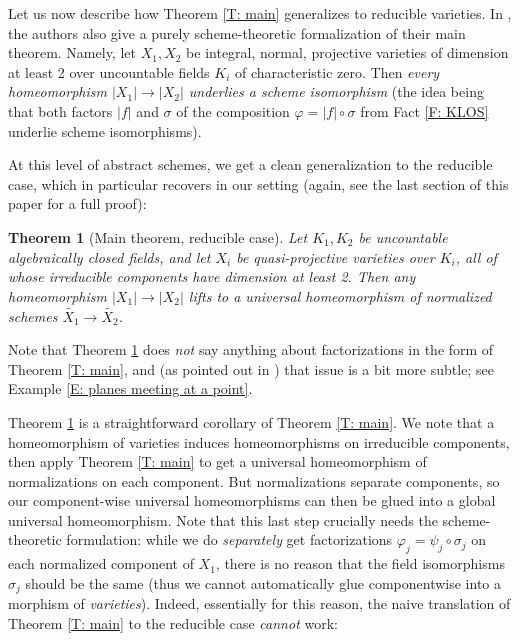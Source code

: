 \documentclass{amsart}
\newtheorem{theorem}{Theorem}[section]
\theoremstyle{definition}
\begin{document}
 Let us now describe how Theorem \ref{T: main} generalizes to reducible varieties. In \cite[Theorem 2.3.3]{KLOS}, the authors also give a purely scheme-theoretic formalization of their main theorem. Namely, let $X_1,X_2$ be integral, normal, projective varieties of dimension at least 2 over uncountable fields $K_i$ of characteristic zero. Then \textit{every homeomorphism $|X_1|\rightarrow|X_2|$ underlies a scheme isomorphism} (the idea being that both factors $|f|$ and $\sigma$ of the composition $\varphi=|f|\circ\sigma$ from Fact \ref{F: KLOS} underlie scheme isomorphisms).

 At this level of abstract schemes, we get a clean generalization to the reducible case, which in particular recovers \cite[Speculation 2.2.10]{KLOS} in our setting (again, see the last section of this paper for a full proof):

 \begin{theorem}[Main theorem, reducible case]\label{T: reducible schemes}
     Let $K_1,K_2$ be uncountable algebraically closed fields, and let $X_i$ be quasi-projective varieties over $K_i$, all of whose irreducible components have dimension at least 2. Then any homeomorphism $|X_1|\rightarrow |X_2|$ lifts to a universal homeomorphism of normalized schemes $\widetilde{X_1}\rightarrow\widetilde{X_2}$.
 \end{theorem}

Note that Theorem \ref{T: reducible schemes} does \textit{not} say anything about factorizations in the form of Theorem \ref{T: main}, and (as pointed out in \cite{KLOS}) that issue is a bit more subtle; see Example \ref{E: planes meeting at a point}.

Theorem \ref{T: reducible schemes} is a straightforward corollary of Theorem \ref{T: main}. We note that a homeomorphism of varieties induces homeomorphisms on irreducible components, then apply Theorem \ref{T: main} to get a universal homeomorphism of normalizations on each component. But normalizations separate components, so our component-wise universal homeomorphisms can then be glued into a global universal homeomorphism. Note that this last step crucially needs the scheme-theoretic formulation: while we do \textit{separately} get factorizations $\varphi_j=\psi_j\circ\sigma_j$ on each normalized component of $X_1$, there is no reason that the field isomorphisms $\sigma_j$ should be the same (thus we cannot automatically glue componentwise into a morphism of \textit{varieties}). Indeed, essentially for this reason, the naive translation of Theorem \ref{T: main} to the reducible case \textit{cannot} work:
\end{document}
